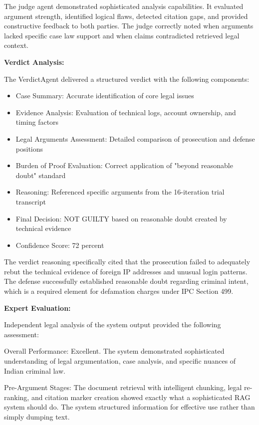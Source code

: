 \documentclass[12pt,singleside,a4paper]{article}
\begin{document}
The judge agent demonstrated sophisticated analysis capabilities. It evaluated argument strength, identified logical flaws, detected citation gaps, and provided constructive feedback to both parties. The judge correctly noted when arguments lacked specific case law support and when claims contradicted retrieved legal context.

\textbf{Verdict Analysis:}

The VerdictAgent delivered a structured verdict with the following components:

\begin{itemize}
\item Case Summary: Accurate identification of core legal issues
\item Evidence Analysis: Evaluation of technical logs, account ownership, and timing factors
\item Legal Arguments Assessment: Detailed comparison of prosecution and defense positions
\item Burden of Proof Evaluation: Correct application of "beyond reasonable doubt" standard
\item Reasoning: Referenced specific arguments from the 16-iteration trial transcript
\item Final Decision: NOT GUILTY based on reasonable doubt created by technical evidence
\item Confidence Score: 72 percent
\end{itemize}

The verdict reasoning specifically cited that the prosecution failed to adequately rebut the technical evidence of foreign IP addresses and unusual login patterns. The defense successfully established reasonable doubt regarding criminal intent, which is a required element for defamation charges under IPC Section 499.

\textbf{Expert Evaluation:}

Independent legal analysis of the system output provided the following assessment:

Overall Performance: Excellent. The system demonstrated sophisticated understanding of legal argumentation, case analysis, and specific nuances of Indian criminal law.

Pre-Argument Stages: The document retrieval with intelligent chunking, legal re-ranking, and citation marker creation showed exactly what a sophisticated RAG system should do. The system structured information for effective use rather than simply dumping text.
\end{document}

